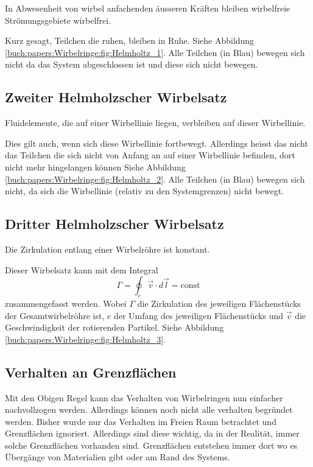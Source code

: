 \begin{displayquote}
    In Abwesenheit von wirbel anfachenden äusseren Kräften bleiben wirbelfreie Strömungsgebiete wirbelfrei.
\end{displayquote}

Kurz gesagt, Teilchen die ruhen, bleiben in Ruhe. 
Siehe Abbildung \ref{buch:papers:Wirbelringe:fig:Helmholtz_1}. 
Alle Teilchen (in Blau) bewegen sich nicht da das System abgeschlossen ist und diese sich nicht bewegen.

\subsection{Zweiter Helmholzscher Wirbelsatz}

\begin{displayquote}
    Fluidelemente, die auf einer Wirbellinie liegen, verbleiben auf dieser Wirbellinie.
\end{displayquote}

Dies gilt auch, wenn sich diese Wirbellinie fortbewegt. 
Allerdings heisst das nicht das Teilchen die sich nicht von Anfang an auf einer Wirbellinie befinden, dort nicht mehr hingelangen können  
Siehe Abbildung \ref{buch:papers:Wirbelringe:fig:Helmholtz_2}. 
Alle Teilchen (in Blau) bewegen sich nicht, da sich die Wirbellinie (relativ zu den Systemgrenzen) nicht bewegt.

\subsection{Dritter Helmholzscher Wirbelsatz}

\begin{displayquote}
    Die Zirkulation entlang einer Wirbelröhre ist konstant. 
\end{displayquote}

Dieser Wirbelsatz kann mit dem Integral 
\[
\Gamma
= 
\oint_{c} \vec{v} \cdot d \vec{l}
=
\text{const}
\]
zusammengefasst werden. 
Wobei \(\Gamma\) die Zirkulation des jeweiligen Flächenstücks der Gesamtwirbelröhre ist, c der Umfang des jeweiligen Flächenstücks und \(\vec{v}\) die Geschwindigkeit der rotierenden Partikel. 
Siehe Abbildung \ref{buch:papers:Wirbelringe:fig:Helmholtz_3}. 


\subsection{Verhalten an Grenzflächen\label{paper:Wirbelringe:Grenzflaechen}}

Mit den Obigen Regel kann das Verhalten von Wirbelringen nun einfacher nachvollzogen werden. 
Allerdings können noch nicht alle verhalten begründet werden. 
Bisher wurde nur das Verhalten im Freien Raum betrachtet und Grenzflächen ignoriert. 
Allerdings sind diese wichtig, da in der Realität, immer solche Grenzflächen vorhanden sind. 
Grenzflächen entstehen immer dort wo es Übergänge von Materialien gibt oder am Rand des Systems.
